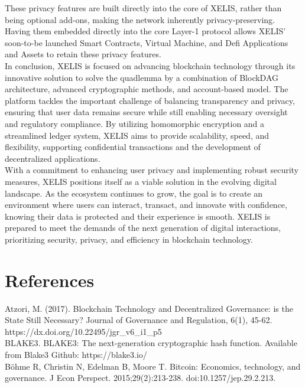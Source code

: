 \documentclass[10pt,a4paper,twocolumn]{article}
\begin{document}
These privacy features are built directly into the core of XELIS, rather than being optional add-ons, making the network inherently privacy-preserving. Having them embedded directly into the core Layer-1 protocol allows XELIS' soon-to-be launched Smart Contracts, Virtual Machine, and Defi Applications and Assets to retain these privacy features.\\

In conclusion, XELIS is focused on advancing blockchain technology through its innovative solution to solve the quadlemma by a combination of BlockDAG architecture, advanced cryptographic methods, and account-based model. The platform tackles the important challenge of balancing transparency and privacy, ensuring that user data remains secure while still enabling necessary oversight and regulatory compliance. By utilizing homomorphic encryption and a streamlined ledger system, XELIS aims to provide scalability, speed, and flexibility, supporting confidential transactions and the development of decentralized applications.\\

With a commitment to enhancing user privacy and implementing robust security measures, XELIS positions itself as a viable solution in the evolving digital landscape. As the ecosystem continues to grow, the goal is to create an environment where users can interact, transact, and innovate with confidence, knowing their data is protected and their experience is smooth. XELIS is prepared to meet the demands of the next generation of digital interactions, prioritizing security, privacy, and efficiency in blockchain technology.\\

\newpage

\section{References}

Atzori, M. (2017). Blockchain Technology and Decentralized Governance: is the State Still Necessary? Journal of Governance and Regulation, 6(1), 45-62. https://dx.doi.org/10.22495/jgr\_v6\_i1\_p5 \\

BLAKE3. BLAKE3: The next-generation cryptographic hash function. Available from Blake3 Github: https://blake3.io/\\

Böhme R, Christin N, Edelman B, Moore T. Bitcoin: Economics, technology, and governance. J Econ Perspect. 2015;29(2):213-238. doi:10.1257/jep.29.2.213.\\
\end{document}
